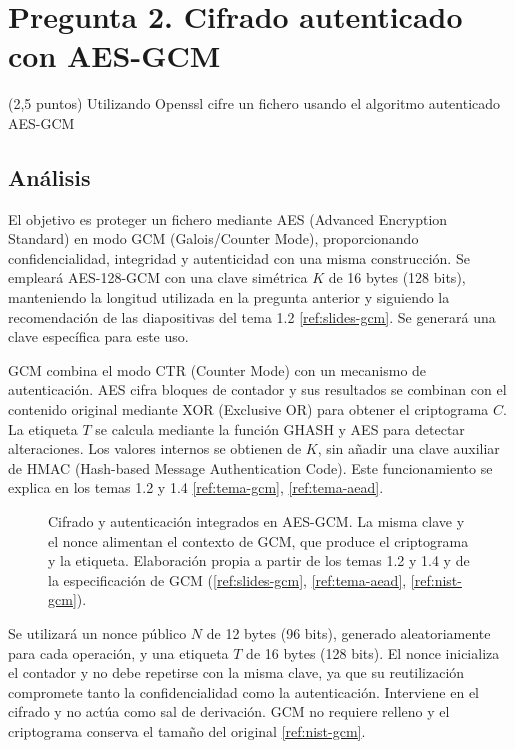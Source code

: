 \section{Pregunta 2. Cifrado autenticado con AES-GCM}
\label{sec:pregunta2}

\begin{enunciado}{(2,5 puntos)}
Utilizando Openssl cifre un fichero usando el algoritmo autenticado AES-GCM
\end{enunciado}

\subsection{Análisis}

El objetivo es proteger un fichero mediante AES (Advanced Encryption Standard) en modo GCM (Galois/Counter Mode), proporcionando confidencialidad, integridad y autenticidad con una misma construcción. Se empleará AES-128-GCM con una clave simétrica $K$ de 16 bytes (128 bits), manteniendo la longitud utilizada en la pregunta anterior y siguiendo la recomendación de las diapositivas del tema 1.2 \ref{ref:slides-gcm}. Se generará una clave específica para este uso.

GCM combina el modo CTR (Counter Mode) con un mecanismo de autenticación. AES cifra bloques de contador y sus resultados se combinan con el contenido original mediante XOR (Exclusive OR) para obtener el criptograma $C$. La etiqueta $T$ se calcula mediante la función GHASH y AES para detectar alteraciones. Los valores internos se obtienen de $K$, sin añadir una clave auxiliar de HMAC (Hash-based Message Authentication Code). Este funcionamiento se explica en los temas 1.2 y 1.4 \ref{ref:tema-gcm}, \ref{ref:tema-aead}.

\begin{figure}[H]
  \centering
  \resizebox{\linewidth}{!}{}
  \caption{Cifrado y autenticación integrados en AES-GCM. La misma clave y el nonce alimentan el contexto de GCM, que produce el criptograma y la etiqueta. Elaboración propia a partir de los temas 1.2 y 1.4 y de la especificación de GCM (\ref{ref:slides-gcm}, \ref{ref:tema-aead}, \ref{ref:nist-gcm}).}
  \label{fig:p2-aes-gcm}
\end{figure}

Se utilizará un nonce público $N$ de 12 bytes (96 bits), generado aleatoriamente para cada operación, y una etiqueta $T$ de 16 bytes (128 bits). El nonce inicializa el contador y no debe repetirse con la misma clave, ya que su reutilización compromete tanto la confidencialidad como la autenticación. Interviene en el cifrado y no actúa como sal de derivación. GCM no requiere relleno y el criptograma conserva el tamaño del original \ref{ref:nist-gcm}.

